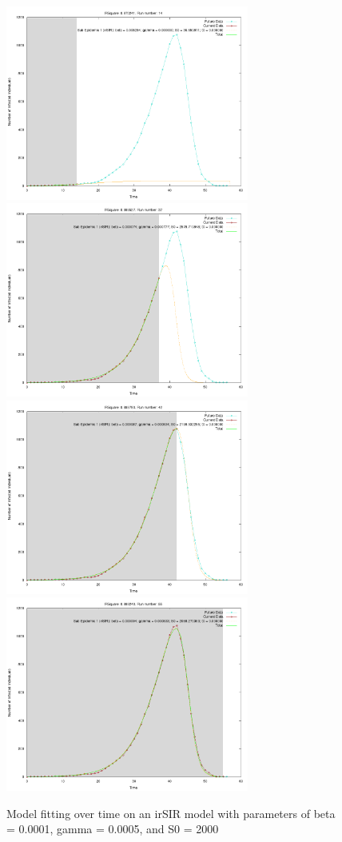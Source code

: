 \begin{centering}
\begin{figure}[h!]
  \includegraphics[width=8cm]{images/single/ex1.png}
  \includegraphics[width=8cm]{images/single/ex2.png}
  \includegraphics[width=8cm]{images/single/ex3.png}
  \includegraphics[width=8cm]{images/single/ex4.png}
  \caption{Model fitting over time on an irSIR model with parameters of
    beta = 0.0001, gamma = 0.0005, and S0 = 2000}
\label{fig:single2}
  \end{figure}
\end{centering}

